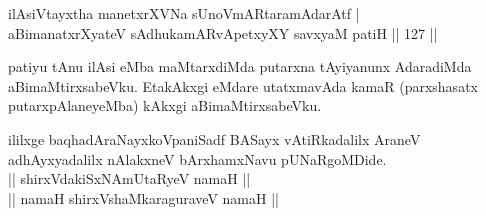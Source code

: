 \begin{shl}
ilA\s siVtayxtha manetxrXVNa sUnoVmARtaramAdarAtf | \\
aBimanatxrXyateV sAdhukamARvApetxyXY savxyaM patiH \hfill|| 127 || 
\end{shl}

\begin{artha}
patiyu tAnu ilAsi eMba maMtarxdiMda putarxna tAyiyanunx AdaradiMda 
aBimaMtirxsabeVku. EtakAkxgi eMdare utatxmavAda kamaR (parxshasatx 
putarxpAlaneyeMba) kAkxgi aBimaMtirxsabeVku.
\end{artha}

\begin{center}
ililxge baqhadAraNayxkoVpaniSadf BASayx vAtiRkadalilx AraneV 
adhAyxyadalilx nAlakxneV bArxhamxNavu pUNaRgoMDide.\\
|| shirxVdakiSxNAmUtaRyeV namaH ||\\
|| namaH shirxVshaMkaraguraveV namaH ||
\end{center}
